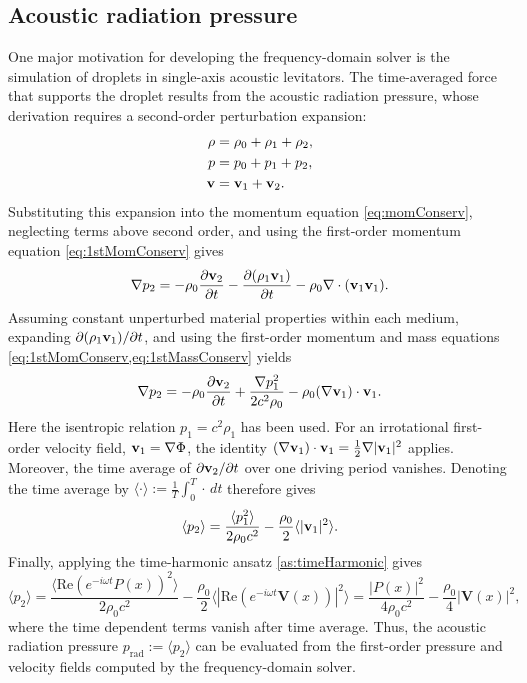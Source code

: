 \documentclass[final,num,12pt]{elsarticle}
\renewcommand{\v}{\TextOrMath{\textv}{\mathbf{v}}}
\newcommand{\V}{\mathbf{V}}
\begin{document}
\subsection{Acoustic radiation pressure}
One major motivation for developing the frequency-domain solver is the
simulation of droplets in single-axis acoustic levitators. The time-averaged
force that supports the droplet results from the acoustic radiation pressure,
whose derivation requires a second-order perturbation expansion:
\begin{equation}
    \begin{aligned}
        \rho &= \rho_0 + \rho_1 + \rho_2, \\
        p &= p_0 + p_1 + p_2, \\
        \v &= \v_1 + \v_2.
        \label{eq:2stPert}
    \end{aligned}
\end{equation}
Substituting this expansion into the momentum equation
\cref{eq:momConserv}, neglecting terms above second order, and using the
first-order momentum equation \cref{eq:1stMomConserv} gives
\begin{equation}
    \nabla p_2 =
    -\rho_0\frac{\partial \v_2}{\partial t}
    -\frac{\partial (\rho_1\v_1)}{\partial t}
    -\rho_0\nabla\cdot(\v_1\v_1).
\end{equation}
Assuming constant unperturbed material properties within each medium,
expanding $\partial(\rho_1\v_1)/\partial t$, and using the first-order
momentum and mass equations \cref{eq:1stMomConserv,eq:1stMassConserv} yields
\begin{equation}
    \nabla p_2 =
    -\rho_0\frac{\partial \v_2}{\partial t}
    +\frac{\nabla p_1^2}{2c^2\rho_0}
    -\rho_0(\nabla\v_1)\cdot\v_1.
\end{equation}
Here the isentropic relation $p_1=c^2\rho_1$ has been used. For an
irrotational first-order velocity field, $\v_1=\nabla\Phi$, the identity
$(\nabla\v_1)\cdot\v_1=\frac{1}{2}\nabla|\v_1|^2$ applies. Moreover, the
time average of $\partial\v_2/\partial t$ over one driving period vanishes.
Denoting the time average by $\langle\cdot\rangle:= \frac{1}{T}\int_0^T \cdot \, dt$ therefore gives
\begin{equation}
    \langle p_2\rangle =
    \frac{\langle p_1^2\rangle}{2\rho_0c^2}
    -\frac{\rho_0}{2}\langle|\v_1|^2\rangle.
\end{equation}
Finally, applying the time-harmonic ansatz \cref{as:timeHarmonic} gives
\begin{equation}
    \langle p_2\rangle =
    \frac{\langle \mathrm{Re}(e^{-i\omega t}P(x))^2\rangle}{2\rho_0c^2}
    -\frac{\rho_0}{2}\langle|\mathrm{Re}(e^{-i\omega t}\V(x))|^2\rangle =  \frac{ |P(x)|^2}{4\rho_0c^2}
    -\frac{\rho_0}{4}|\V(x)|^2,
    \label{eq:acousticRadiationPressure}
\end{equation}
where the time dependent terms vanish after time average. Thus, the acoustic radiation pressure $p_{\mathrm{rad}}:=\langle p_2\rangle$
can be evaluated from the first-order pressure and velocity fields computed by
the frequency-domain solver.
\end{document}
